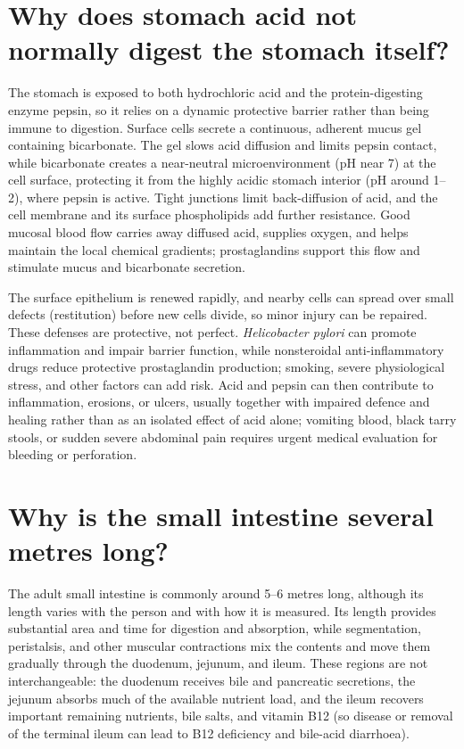 \documentclass[11pt,oneside]{report}
\begin{document}
\section{Why does stomach acid not normally digest the stomach itself?}

The stomach is exposed to both hydrochloric acid and the protein-digesting
enzyme pepsin, so it relies on a dynamic protective barrier rather than being
immune to digestion. Surface cells secrete a continuous, adherent mucus gel
containing bicarbonate. The gel slows acid diffusion and limits pepsin contact,
while bicarbonate creates a near-neutral microenvironment (pH near 7) at the
cell surface, protecting it from the highly acidic stomach interior (pH around
1--2), where pepsin is active. Tight junctions limit back-diffusion of acid,
and the cell membrane and its surface phospholipids add further resistance.
Good mucosal blood flow carries away diffused acid, supplies oxygen, and helps
maintain the local chemical gradients; prostaglandins support this flow and
stimulate mucus and bicarbonate secretion.

The surface epithelium is renewed rapidly, and nearby cells can spread over
small defects (restitution) before new cells divide, so minor injury can be
repaired. These defenses are protective, not perfect. \textit{Helicobacter pylori}
can promote inflammation and impair barrier function, while nonsteroidal
anti-inflammatory drugs reduce protective prostaglandin production; smoking,
severe physiological stress, and other factors can add risk. Acid and pepsin
can then contribute to inflammation, erosions, or ulcers, usually together
with impaired defence and healing rather than as an isolated effect of acid
alone; vomiting blood, black tarry stools, or sudden severe abdominal pain
requires urgent medical evaluation for bleeding or perforation.

\section{Why is the small intestine several metres long?}

The adult small intestine is commonly around 5--6 metres long, although its
length varies with the person and with how it is measured. Its length provides
substantial area and time for digestion and absorption, while segmentation,
peristalsis, and other muscular contractions mix the contents and move them
gradually through the duodenum, jejunum, and ileum. These regions are not
interchangeable: the duodenum receives bile and pancreatic secretions, the
jejunum absorbs much of the available nutrient load, and the ileum recovers
important remaining nutrients, bile salts, and vitamin B12 (so disease or
removal of the terminal ileum can lead to B12 deficiency and bile-acid
diarrhoea).
\end{document}
